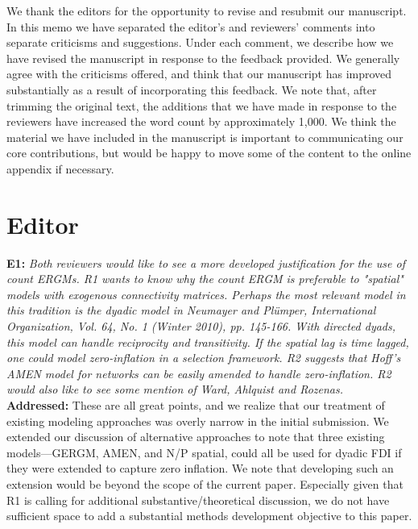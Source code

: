 \documentclass[a4paper,11pt]{texMemo}
\begin{document}
\maketitle

\noindent We thank the editors for the opportunity to revise and resubmit our manuscript. In this memo
we have separated the editor's and reviewers' comments into separate criticisms and
suggestions. Under each comment, we describe how we have revised the manuscript in
response to the feedback provided. We generally agree with the criticisms offered, and think
that our manuscript has improved substantially as a result of incorporating this feedback. We note that, after trimming the original text, the additions that we have made in response to the reviewers have increased the word count by approximately 1,000. We think the material we have included in the manuscript is important to communicating our core contributions, but would be happy to move some of the content to the online appendix if necessary.


\section*{Editor}

\noindent \textbf{E1:} \emph{Both reviewers would like to see a more developed justification for the use of count ERGMs. R1 wants to know why the count ERGM is preferable to "spatial" models with exogenous connectivity matrices. Perhaps the most relevant model in this tradition is the dyadic model in Neumayer and Plümper, International Organization, Vol. 64, No. 1 (Winter 2010), pp. 145-166. With directed dyads, this model can handle reciprocity and transitivity. If the spatial lag is time lagged, one could model zero-inflation in a selection framework. R2 suggests that Hoff's AMEN model for networks can be easily amended to handle zero-inflation. R2 would also like to see some mention of Ward, Ahlquist and Rozenas.}\\

\noindent \textbf{Addressed:} These are all great points, and we realize that our treatment of existing modeling approaches was overly narrow in the initial submission. We extended our discussion of alternative approaches to note that three existing models---GERGM, AMEN, and N/P spatial, could all be used for dyadic FDI if they were extended to capture zero inflation. We note that developing such an extension would be beyond the scope of the current paper. Especially given that R1 is calling for additional substantive/theoretical discussion, we do not have sufficient space to add a substantial methods development objective to this paper. \\
\end{document}

